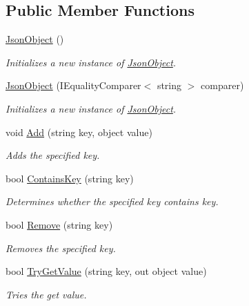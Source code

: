 \subsection*{Public Member Functions}
\begin{DoxyCompactItemize}
\item 
\hyperlink{class_accela_1_1_windows_store_s_d_k_1_1_json_object_a393f5e39db4f46a06de04b4144b34755}{Json\+Object} ()
\begin{DoxyCompactList}\small\item\em Initializes a new instance of \hyperlink{class_accela_1_1_windows_store_s_d_k_1_1_json_object}{Json\+Object}. \end{DoxyCompactList}\item 
\hyperlink{class_accela_1_1_windows_store_s_d_k_1_1_json_object_a64023ee7468a896f029e97e7f91b367f}{Json\+Object} (I\+Equality\+Comparer$<$ string $>$ comparer)
\begin{DoxyCompactList}\small\item\em Initializes a new instance of \hyperlink{class_accela_1_1_windows_store_s_d_k_1_1_json_object}{Json\+Object}. \end{DoxyCompactList}\item 
void \hyperlink{class_accela_1_1_windows_store_s_d_k_1_1_json_object_a4283b2cd4ba79d8554c64650072e5673}{Add} (string key, object value)
\begin{DoxyCompactList}\small\item\em Adds the specified key. \end{DoxyCompactList}\item 
bool \hyperlink{class_accela_1_1_windows_store_s_d_k_1_1_json_object_a0f012c29dc6dc5376690d40e980298db}{Contains\+Key} (string key)
\begin{DoxyCompactList}\small\item\em Determines whether the specified key contains key. \end{DoxyCompactList}\item 
bool \hyperlink{class_accela_1_1_windows_store_s_d_k_1_1_json_object_a1c12749e24ad9886ad9a1cd8286195dc}{Remove} (string key)
\begin{DoxyCompactList}\small\item\em Removes the specified key. \end{DoxyCompactList}\item 
bool \hyperlink{class_accela_1_1_windows_store_s_d_k_1_1_json_object_ae7eafdb09f133c2a0361272ffa18ac0b}{Try\+Get\+Value} (string key, out object value)
\begin{DoxyCompactList}\small\item\em Tries the get value. \end{DoxyCompactList}\item 

\end{DoxyCompactItemize}
